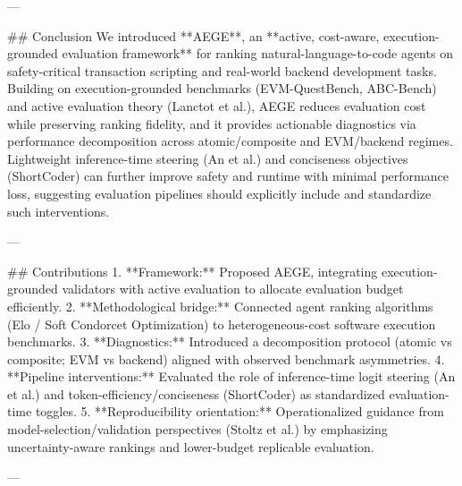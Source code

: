 ---

## Conclusion  
We introduced **AEGE**, an **active, cost-aware, execution-grounded evaluation framework** for ranking natural-language-to-code agents on safety-critical transaction scripting and real-world backend development tasks. Building on execution-grounded benchmarks (EVM-QuestBench, ABC-Bench) and active evaluation theory (Lanctot et al.), AEGE reduces evaluation cost while preserving ranking fidelity, and it provides actionable diagnostics via performance decomposition across atomic/composite and EVM/backend regimes. Lightweight inference-time steering (An et al.) and conciseness objectives (ShortCoder) can further improve safety and runtime with minimal performance loss, suggesting evaluation pipelines should explicitly include and standardize such interventions.

---

## Contributions  
1. **Framework:** Proposed AEGE, integrating execution-grounded validators with active evaluation to allocate evaluation budget efficiently.  
2. **Methodological bridge:** Connected agent ranking algorithms (Elo / Soft Condorcet Optimization) to heterogeneous-cost software execution benchmarks.  
3. **Diagnostics:** Introduced a decomposition protocol (atomic vs composite; EVM vs backend) aligned with observed benchmark asymmetries.  
4. **Pipeline interventions:** Evaluated the role of inference-time logit steering (An et al.) and token-efficiency/conciseness (ShortCoder) as standardized evaluation-time toggles.  
5. **Reproducibility orientation:** Operationalized guidance from model-selection/validation perspectives (Stoltz et al.) by emphasizing uncertainty-aware rankings and lower-budget replicable evaluation.

---